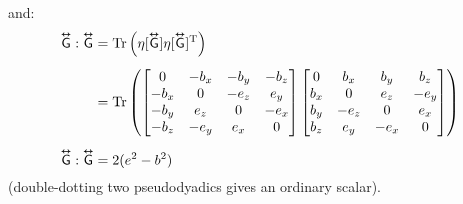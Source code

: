\documentclass[12pt]{article}
\newcommand{\capdy}[1]{ \overset{ \text{\tiny$\bm\leftrightarrow$} }{\vphantom{\text{\small{A}}}\smash{#1}} }
\begin{document}
and:
\begin{equation}\label{eq:gddg}
\begin{split}
\capdy{\mathsf{G}} : \capdy{\mathsf{G}} &= \mathrm{Tr} \left( \eta [ \capdy{\mathsf{G}} ] \eta [ \capdy{\mathsf{G}} ]^{\mathrm{T}} \right) \\[5pt]
&=
\mathrm{Tr}
\left(
\begin{bmatrix}
0 & -b_x & -b_y & -b_z \\
-b_x & 0 & -e_z & e_y \\
-b_y & e_z & 0 & -e_x \\
-b_z & -e_y & e_x & 0
\end{bmatrix}
\begin{bmatrix}
0 & b_x & b_y & b_z \\
b_x & 0 & e_z & -e_y \\
b_y & -e_z & 0 & e_x \\
b_z & e_y & -e_x & 0
\end{bmatrix}
\right) \\[5pt]
\capdy{\mathsf{G}} : \capdy{\mathsf{G}} &= 2 (e^2 - b^2)
\end{split}
\end{equation}
(double-dotting two pseudodyadics gives an ordinary scalar).
\end{document}

